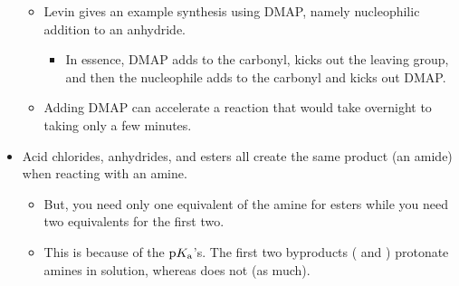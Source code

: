 \documentclass[../notes.tex]{subfiles}
\begin{document}
\begin{itemize}
    \begin{itemize}
        \item Levin gives an example synthesis using DMAP, namely nucleophilic addition to an anhydride.
        \begin{itemize}
            \item In essence, DMAP adds to the carbonyl, kicks out the leaving group, and then the nucleophile adds to the carbonyl and kicks out DMAP.
        \end{itemize}
        \item Adding DMAP can accelerate a reaction that would take overnight to taking only a few minutes.
    \end{itemize}
    \item Acid chlorides, anhydrides, and esters all create the same product (an amide) when reacting with an amine.
    \begin{itemize}
        \item But, you need only one equivalent of the amine for esters while you need two equivalents for the first two.
        \item This is because of the $\text{p}K_\text{a}$'s. The first two byproducts ( and ) protonate amines in solution, whereas  does not (as much).
    \end{itemize}
\end{itemize}
\end{document}
